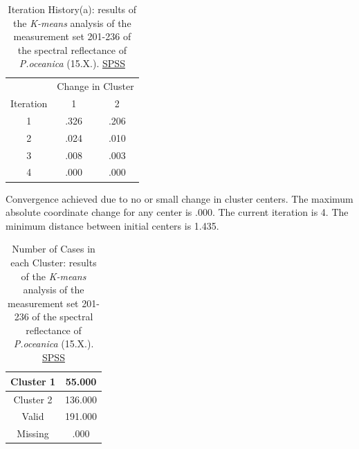 \documentclass[10pt, a4paper]{article}
\begin{document}
\begin{appendices}
\begin{table}[htbp]
	\caption{Iteration History(a): results of the \textit{K-means} analysis of the measurement set 201-236 of the spectral reflectance of \textit{P.oceanica} (15.X.).  \href{http://www.spss.com/}{SPSS}}
	\begin{center}
	\begin{tabular}{|c|c|c|}
		\hline\hline
		& \multicolumn{2}{|c|}{Change in Cluster} \\
		 Iteration & 1 & 2 \\ \hline\hline
		1 &	.326 &	.206 \\ \hline
		2 &	.024 & 	.010 \\ \hline
		3 &	.008 &	.003 \\ \hline
		4 &	.000 &	.000 \\ \hline
	\end{tabular}
	\end{center}
	Convergence achieved due to no or small change in cluster centers. The maximum absolute coordinate change for any center is .000. The current iteration is 4. The minimum distance between initial centers is 1.435.
\label{tab:21}
\end{table}

\begin{table}[H]
	\caption{Number of Cases in each Cluster: results of the \textit{K-means} analysis of the measurement set 201-236 of the spectral reflectance of \textit{P.oceanica} (15.X.).  \href{http://www.spss.com/}{SPSS}}
		\begin{center}
		\begin{tabular}{|c|c|}
		\hline\hline
			Cluster 1 & 55.000 \\ \hline
			Cluster 2 & 136.000 \\ \hline
			Valid &	191.000 \\ \hline
			Missing & .000 \\ \hline
		\end{tabular}
		\end{center}
	\label{tab:22}
\end{table}
\pagebreak


\end{appendices}
\end{document}
